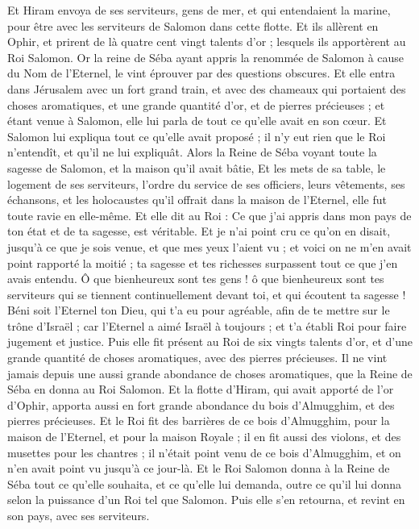 \begin{multicols}{2}
Et Hiram envoya de ses serviteurs, gens de mer, et qui entendaient la marine, pour être avec les serviteurs de Salomon dans cette flotte.
Et ils allèrent en Ophir, et prirent de là quatre cent vingt talents d'or ; lesquels ils apportèrent au Roi Salomon.
\VerseOne{}Or la reine de Séba ayant appris la renommée de Salomon à cause du Nom de l'Eternel, le vint éprouver par des questions obscures.
Et elle entra dans Jérusalem avec un fort grand train, et avec des chameaux qui portaient des choses aromatiques, et une grande quantité d'or, et de pierres précieuses ; et étant venue à Salomon, elle lui parla de tout ce qu'elle avait en son cœur.
Et Salomon lui expliqua tout ce qu'elle avait proposé ; il n'y eut rien que le Roi n'entendît, et qu'il ne lui expliquât.
Alors la Reine de Séba voyant toute la sagesse de Salomon, et la maison qu'il avait bâtie,
Et les mets de sa table, le logement de ses serviteurs, l'ordre du service de ses officiers, leurs vêtements, ses échansons, et les holocaustes qu'il offrait dans la maison de l'Eternel, elle fut toute ravie en elle-même.
Et elle dit au Roi : Ce que j'ai appris dans mon pays de ton état et de ta sagesse, est véritable.
Et je n'ai point cru ce qu'on en disait, jusqu'à ce que je sois venue, et que mes yeux l'aient vu ; et voici on ne m'en avait point rapporté la moitié ; ta sagesse et tes richesses surpassent tout ce que j'en avais entendu.
Ô que bienheureux sont tes gens ! ô que bienheureux sont tes serviteurs qui se tiennent continuellement devant toi, et qui écoutent ta sagesse !
Béni soit l'Eternel ton Dieu, qui t'a eu pour agréable, afin de te mettre sur le trône d'Israël ; car l'Eternel a aimé Israël à toujours ; et t'a établi Roi pour faire jugement et justice.
Puis elle fit présent au Roi de six vingts talents d'or, et d'une grande quantité de choses aromatiques, avec des pierres précieuses. Il ne vint jamais depuis une aussi grande abondance de choses aromatiques, que la Reine de Séba en donna au Roi Salomon.
Et la flotte d'Hiram, qui avait apporté de l'or d'Ophir, apporta aussi en fort grande abondance du bois d'Almugghim, et des pierres précieuses.
Et le Roi fit des barrières de ce bois d'Almugghim, pour la maison de l'Eternel, et pour la maison Royale ; il en fit aussi des violons, et des musettes pour les chantres ; il n'était point venu de ce bois d'Almugghim, et on n'en avait point vu jusqu'à ce jour-là.
Et le Roi Salomon donna à la Reine de Séba tout ce qu'elle souhaita, et ce qu'elle lui demanda, outre ce qu'il lui donna selon la puissance d'un Roi tel que Salomon. Puis elle s'en retourna, et revint en son pays, avec ses serviteurs.

\end{multicols}
